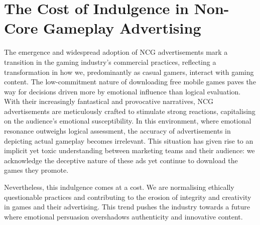 \documentclass[a4paper, 12pt, mla]{homework}
\begin{document}
\section*{The Cost of Indulgence in Non-Core Gameplay Advertising}
The emergence and widespread adoption of NCG advertisements mark a transition in the gaming industry's commercial practices, reflecting a transformation in how we, predominantly as casual gamers, interact with gaming content. 
The low-commitment nature of downloading free mobile games paves the way for decisions driven more by emotional influence than logical evaluation. 
With their increasingly fantastical and provocative narratives, NCG advertisements are meticulously crafted to stimulate strong reactions, capitalising on the audience's emotional susceptibility.
In this environment, where emotional resonance outweighs logical assessment, the accuracy of advertisements in depicting actual gameplay becomes irrelevant.
This situation has given rise to an implicit yet toxic understanding between marketing teams and their audience: we acknowledge the deceptive nature of these ads yet continue to download the games they promote. 

Nevertheless, this indulgence comes at a cost. 
We are normalising ethically questionable practices and contributing to the erosion of integrity and creativity in games and their advertising. 
This trend pushes the industry towards a future where emotional persuasion overshadows authenticity and innovative content.


\vfill
{}

\end{document}
